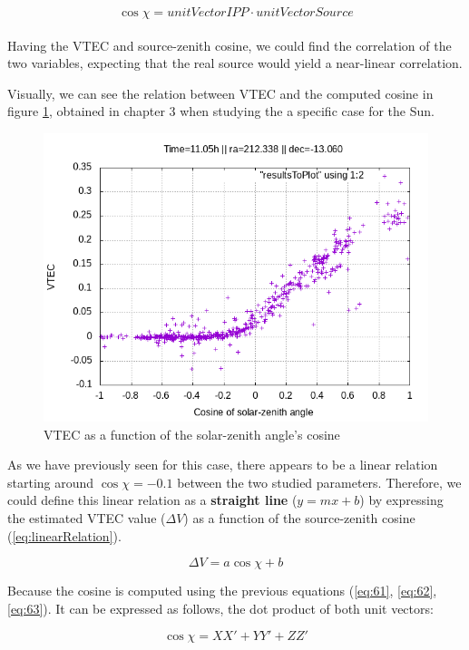 \begin{equation} \label{eq:63}
\cos \chi = unitVectorIPP \cdot unitVectorSource
\end{equation}\\

Having the VTEC and source-zenith cosine, we could find the correlation of the two variables, expecting that the real source would yield a near-linear correlation.

Visually, we can see the relation between VTEC and the computed cosine in figure \ref{fig:solar-zenith-angle}, obtained in chapter 3 when studying the a specific case for the Sun.

\begin{figure}[!htb]
	\begin{centering}
		\includegraphics[width=0.5\linewidth]{images/ch4/resultSunTest.png}
		\caption{VTEC as a function of the solar-zenith angle's cosine}
		\label{fig:solar-zenith-angle}
	\end{centering}
\end{figure}

As we have previously seen for this case, there appears to be a linear relation starting around $\cos \chi = -0.1$ between the two studied parameters. Therefore, we could define this linear relation as a \textbf{straight line} ($y = mx + b$) by expressing the estimated VTEC value ($\Delta V$) as a function of the source-zenith cosine (\ref{eq:linearRelation}).

\begin{equation} \label{eq:linearRelation}
\Delta V = a\cos \chi + b
\end{equation}

Because the cosine is computed using the previous equations (\ref{eq:61}, \ref{eq:62}, \ref{eq:63}). It can be expressed as follows, the dot product of both unit vectors:

\begin{equation} \label{eq:cosine}
\cos \chi = XX' + YY' + ZZ'
\end{equation}

